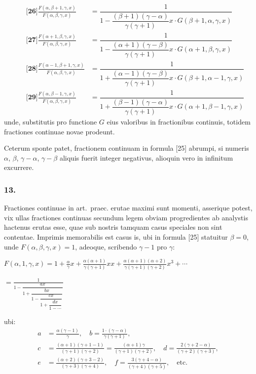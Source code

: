 \documentclass[12pt,a4paper]{article}
\newcommand{\1}{\ensuremath{\mathrlap{\,|\,}}} %
\begin{document}
\begin{align*}
\qquad\textbf{[26]} \frac{F(\alpha, \beta+1, \gamma, x)}{F(\alpha, \beta, \gamma, x)} &= \dfrac{1}{1 - \dfrac{(\beta+1)(\gamma-\alpha)}{\gamma(\gamma+1)}x \cdot G(\beta+1, \alpha, \gamma, x)}\\[4pt]
\qquad\textbf{[27]} \frac{F(\alpha+1, \beta, \gamma, x)}{F(\alpha, \beta, \gamma, x)} &= \dfrac{1}{1 - \dfrac{(\alpha+1)(\gamma-\beta)}{\gamma(\gamma+1)}x \cdot G(\alpha+1, \beta, \gamma, x)}\\[4pt]
\qquad\textbf{[28]} \frac{F(\alpha-1, \beta+1, \gamma, x)}{F(\alpha, \beta, \gamma, x)} &= \dfrac{1}{1 + \dfrac{(\alpha-1)(\gamma-\beta)}{\gamma(\gamma+1)}x \cdot G(\beta+1, \alpha-1, \gamma, x)}\\[4pt]
\qquad\textbf{[29]} \frac{F(\alpha, \beta-1, \gamma, x)}{F(\alpha, \beta, \gamma, x)} &= \dfrac{1}{1 + \dfrac{(\beta-1)(\gamma-\alpha)}{\gamma(\gamma+1)}x \cdot G(\alpha+1, \beta-1, \gamma, x)}
\end{align*}
unde, substitutis pro functione $G$ eius valoribus in fractionibus continuis, totidem fractiones continuae novae prodeunt.

Ceterum sponte patet, fractionem continuam in formula [25] abrumpi, si numeris $\alpha$, $\beta$, $\gamma-\alpha$, $\gamma-\beta$ aliquis fuerit integer negativus, alioquin vero in infinitum excurrere.

\subsubsection*{13.}

Fractiones continuae in art.~praec. erutae maximi sunt momenti, asserique potest, vix ullas fractiones continuas secundum legem obviam progredientes ab analystis hactenus erutas esse, quae sub nostris tamquam casus speciales non sint contentae. Imprimis memorabilis est casus is, ubi in formula [25] statuitur $\beta = 0$, unde $F(\alpha, \beta, \gamma, x) = 1$, adeoque, scribendo $\gamma - 1$ pro $\gamma$:

\begin{center}
$\displaystyle
F(\alpha, 1, \gamma, x) =
1 + \frac{\alpha}{\gamma}x + \frac{\alpha(\alpha+1)}{\gamma(\gamma+1)}xx + \frac{\alpha(\alpha+1)(\alpha+2)}{\gamma(\gamma+1)(\gamma+2)}x^3 + \cdots
$

$\displaystyle = \frac{1}{1 - \dfrac{ax}{1 + \dfrac{bx}{1 - \dfrac{cx}{1 + \dfrac{dx}{1 - \cdots}}}}}$
\end{center}

ubi:
\begin{align*}
a &= \frac{\alpha(\gamma-1)}{\gamma},\quad
b = \frac{1\cdot(\gamma-\alpha)}{\gamma(\gamma+1)},\\
c &= \frac{(\alpha+1)(\gamma+1-1)}{(\gamma+1)(\gamma+2)} = \frac{(\alpha+1)\gamma}{(\gamma+1)(\gamma+2)},\quad
d = \frac{2(\gamma+2-\alpha)}{(\gamma+2)(\gamma+3)},\\
e &= \frac{(\alpha+2)(\gamma+3-2)}{(\gamma+3)(\gamma+4)},\quad
f = \frac{3(\gamma+4-\alpha)}{(\gamma+4)(\gamma+5)},\quad\text{etc.}
\end{align*}
\end{document}
